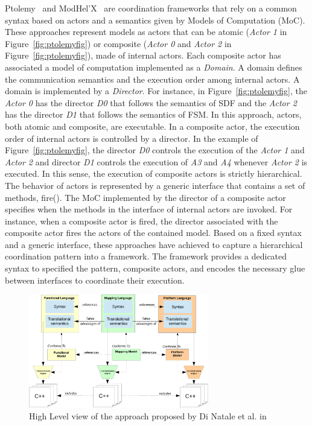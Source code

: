 Ptolemy~\cite{ptoleframebib} and ModHel'X~\cite{modhelxbib} are coordination frameworks that rely on a common syntax based on actors and a semantics given by Models of Computation (MoC). These approaches represent models as actors that can be atomic (\eg \emph{Actor 1} in Figure~\ref{fig:ptolemyfig}) or composite (\eg \emph{Actor 0} and \emph{Actor 2} in Figure~\ref{fig:ptolemyfig}), \ie made of internal actors. Each composite actor has associated a model of computation implemented as a \emph{Domain}. A domain defines the communication semantics and the execution order among internal actors. A domain is implemented by a \emph{Director}. For instance, in Figure~\ref{fig:ptolemyfig}, the \emph{Actor 0} has the director \emph{D0} that follows the semantics of SDF and the \emph{Actor 2} has the director \emph{D1} that follows the semantics of FSM. In this approach, actors, both atomic and composite, are executable. In a composite actor, the execution order of internal actors is controlled by a director. In the example of Figure~\ref{fig:ptolemyfig}, the director \emph{D0} controls the execution of the \emph{Actor 1} and \emph{Actor 2} and director \emph{D1} controls the execution of \emph{A3} and \emph{A4} whenever \emph{Actor 2} is executed. In this sense, the execution of composite actors is strictly hierarchical. The behavior of actors is represented by a generic interface that contains a set of methods, \eg fire(). The MoC implemented by the director of a composite actor specifies when the methods in the interface of internal actors are invoked. For instance, when a composite actor is fired, the director associated with the composite actor fires the actors of the contained model. Based on a fixed syntax and a generic interface, these approaches have achieved to capture a hierarchical coordination pattern into a framework. The framework provides a dedicated syntax to specified the pattern, \ie composite actors, and encodes the necessary glue between interfaces to coordinate their execution. 
         	

         	\begin{figure}
         		\begin{center}
         			\includegraphics[width=0.7\textwidth]{background/figs/diNatale}
         			\caption{High Level view of the approach proposed by Di Natale et al. in~\cite{dinatale}}
         			\label{fig:diNatale}
         		\end{center}
         	\end{figure}

